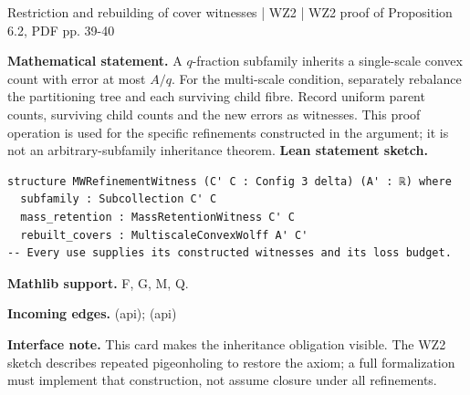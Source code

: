 \documentclass[10pt,a4paper]{article}
\newcommand{\nodecard}[1]{\hyperlink{node-#1}{\texttt{\detokenize{#1}}}}
\begin{document}
\begin{minipage}{\linewidth}
\hypertarget{node-Iwolffbalance}{}
\begin{tcolorbox}[colback=white,colframe=apifg,colbacktitle=apibg,coltitle=ink,boxrule=0.45pt,arc=1.6mm,left=3mm,right=3mm,top=2mm,bottom=2mm,title={\sffamily\bfseries WZ2 proof operation \hfill \texttt{Iwolffbalance}}]
{\sffamily\small\color{muted}Restriction and rebuilding of cover witnesses | WZ2 | WZ2 proof of Proposition 6.2, PDF pp. 39-40}\par
\textbf{Mathematical statement.} A $q$-fraction subfamily inherits a single-scale convex count with error at most $A/q$.
For the multi-scale condition, separately rebalance the partitioning tree and each surviving child fibre.
Record uniform parent counts, surviving child counts and the new errors as witnesses.
This proof operation is used for the specific refinements constructed in the argument; it is not an arbitrary-subfamily inheritance theorem.
\smallskip\textbf{Lean statement sketch.}
\begin{Verbatim}[fontsize=\small,breaklines=true,breakanywhere=true,tabsize=2]
structure MWRefinementWitness (C' C : Config 3 delta) (A' : ℝ) where
  subfamily : Subcollection C' C
  mass_retention : MassRetentionWitness C' C
  rebuilt_covers : MultiscaleConvexWolff A' C'
-- Every use supplies its constructed witnesses and its loss budget.
\end{Verbatim}
{\footnotesize\textbf{Mathlib support.} F, G, M, Q.\par
\textbf{Incoming edges.} \nodecard{W2L2_13} (api); \nodecard{W2CWA} (api)\par}
{\footnotesize\textbf{Interface note.} This card makes the inheritance obligation visible. The WZ2 sketch describes repeated pigeonholing to restore the axiom; a full formalization must implement that construction, not assume closure under all refinements.}
\end{tcolorbox}\end{minipage}\par\medskip
\end{document}
